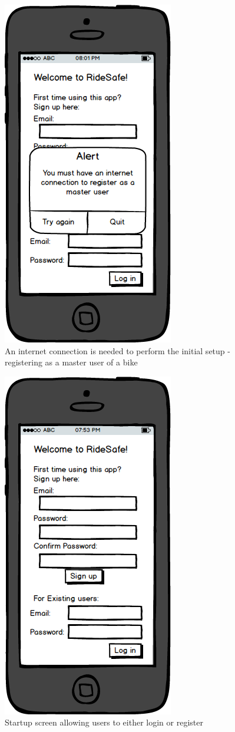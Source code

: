 \documentclass[a4paper]{report}
\begin{document}
\clearpage
\begin{figure}
\centering
\includegraphics[scale=0.9]{figures/prototype_2/no_conn_master}
\caption{An internet connection is needed to perform the initial setup - registering as a master user of a bike}
\end{figure}
\clearpage
\begin{figure}
\centering
\includegraphics[scale=0.9]{figures/prototype_2/startup}
\caption{Startup screen allowing users to either login or register}
\end{figure}
\end{document}
